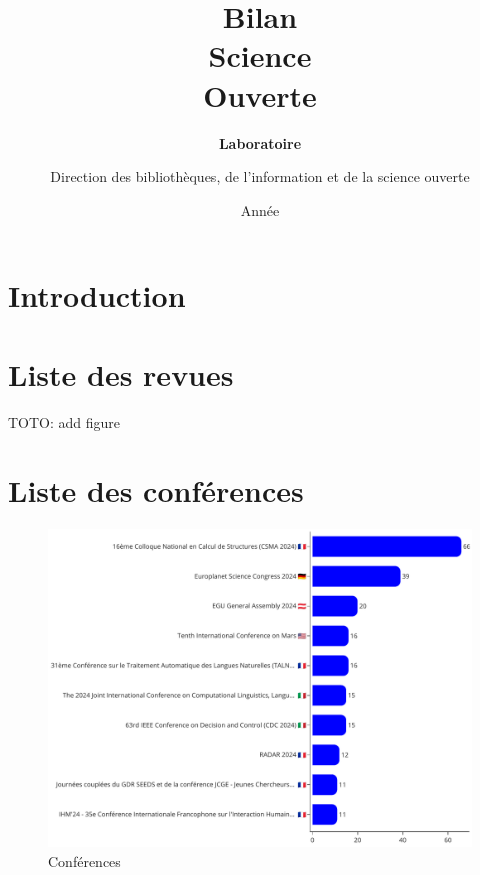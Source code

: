 \documentclass[french, 11pt]{../../dibiso/biso}
\title{Bilan \\ Science \\ Ouverte}
\author{Direction des bibliothèques, de l’information et de la science ouverte}
\date{Année \reportyear}
\subtitle{\textbf{Laboratoire \labacronym} \\
  \medskip
  \labfullname
}
\begin{document}
\renewcommand{\arraystretch}{1.5}


\maketitle

\tableofcontents

\pagebreak



\section{Introduction}







\pagebreak

\section{Liste des revues}

TOTO: add figure
%  







\pagebreak

\section{Liste des conférences}

\begin{figure}[!h]
  \includegraphics[width=\textwidth]{figures/conferences.pdf}
  \centering
  \caption{Conférences}
  \label{fig_conferences}
\end{figure}
\end{document}
